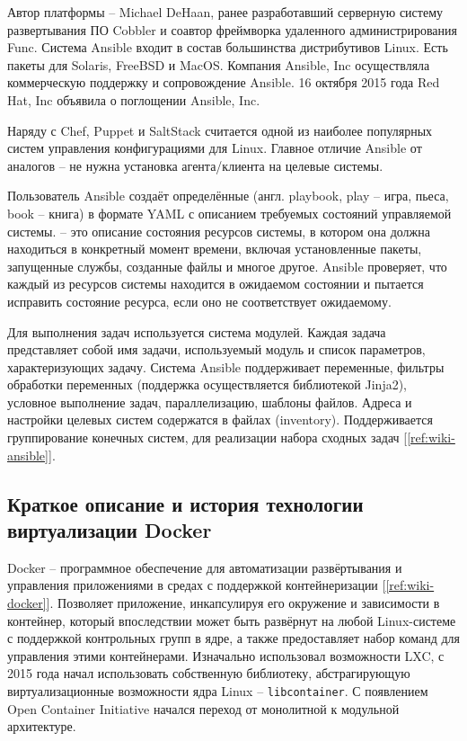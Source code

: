 Автор платформы -- Michael DeHaan, ранее разработавший серверную систему
развертывания ПО Cobbler и соавтор фреймворка удаленного
администрирования Func. Система Ansible входит в состав большинства
дистрибутивов Linux. Есть пакеты для Solaris, FreeBSD и MacOS. Компания Ansible,
Inc осуществляла коммерческую поддержку и сопровождение Ansible. 16 октября 2015
года Red Hat, Inc объявила о поглощении Ansible, Inc.

Наряду с Chef, Puppet и SaltStack считается одной из наиболее популярных систем
управления конфигурациями для Linux. Главное отличие Ansible от аналогов -- не
нужна установка агента/клиента на целевые системы.

Пользователь Ansible создаёт определённые  (англ. playbook,
play -- игра, пьеса, book -- книга) в формате YAML с описанием требуемых
состояний управляемой системы.  -- это описание состояния
ресурсов системы, в котором она должна находиться в конкретный момент времени,
включая установленные пакеты, запущенные службы, созданные файлы и многое
другое. Ansible проверяет, что каждый из ресурсов системы находится в ожидаемом
состоянии и пытается исправить состояние ресурса, если оно не соответствует
ожидаемому.

Для выполнения задач используется система модулей. Каждая задача представляет
собой имя задачи, используемый модуль и список параметров, характеризующих
задачу. Система Ansible поддерживает переменные, фильтры обработки переменных
(поддержка осуществляется библиотекой Jinja2), условное
выполнение задач, параллелизацию, шаблоны файлов. Адреса и настройки целевых
систем содержатся в файлах  (inventory). Поддерживается
группирование конечных систем, для реализации набора сходных задач
[\ref{ref:wiki-ansible}].

\subsection{Краткое описание и история технологии виртуализации Docker}
Docker -- программное обеспечение для автоматизации развёртывания
и управления приложениями в средах с поддержкой контейнеризации
[\ref{ref:wiki-docker}].
Позволяет  приложение, инкапсулируя его окружение и
зависимости в контейнер, который впоследствии может быть развёрнут на любой
Linux-системе с поддержкой контрольных групп в ядре, а также предоставляет набор
команд для управления этими контейнерами.
Изначально использовал возможности LXC, с 2015 года начал использовать
собственную библиотеку, абстрагирующую виртуализационные возможности ядра Linux
-- \texttt{libcontainer}.
С появлением Open Container Initiative начался переход от монолитной к модульной
архитектуре.


